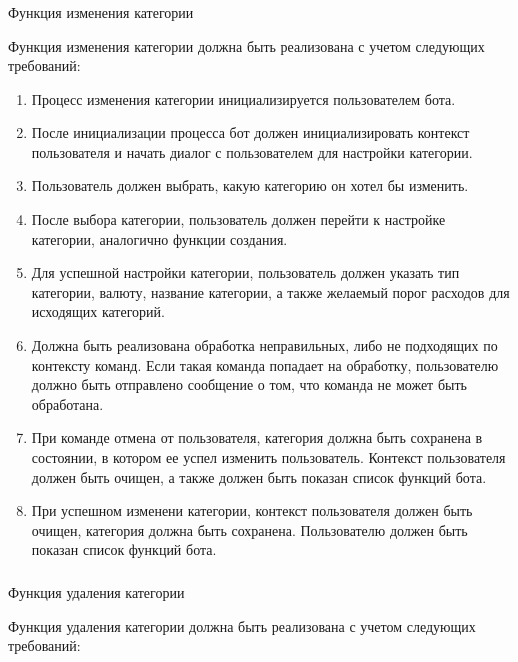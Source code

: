 \subsubsection{} Функция изменения категории
\label{sec:domain:specification:editcategory}

Функция изменения категории должна быть реализована с учетом следующих требований:

\begin{enumerate}
	\item Процесс изменения категории инициализируется пользователем бота.
	\item После инициализации процесса бот должен инициализировать контекст пользователя и начать диалог с пользователем для настройки категории.
	\item Пользователь должен выбрать, какую категорию он хотел бы изменить.
	\item После выбора категории, пользователь должен перейти к настройке категории, аналогично функции создания.
	\item Для успешной настройки категории, пользователь должен указать тип категории, валюту, название категории, а также желаемый порог расходов для исходящих категорий.
	\item Должна быть реализована обработка неправильных, либо не подходящих по контексту команд. Если такая команда попадает на обработку, пользователю должно быть отправлено сообщение о том, что команда не может быть обработана.
	\item При команде отмена от пользователя, категория должна быть сохранена в состоянии, в котором ее успел изменить пользователь. Контекст пользователя должен быть очищен, а также должен быть показан список функций бота.
	\item При успешном изменени категории, контекст пользователя должен быть очищен, категория должна быть сохранена. Пользователю должен быть показан список функций бота.
\end{enumerate}

\subsubsection{} Функция удаления категории
\label{sec:domain:specification:deletecategory}

Функция удаления категории должна быть реализована с учетом следующих требований:


